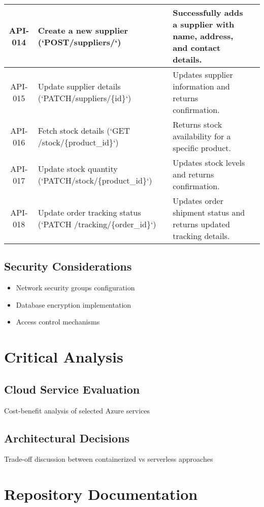 \documentclass{llncs}
\begin{document}
\begin{longtable}{|c|>{\raggedright}p{7.5cm}|p{5.5cm}|p{2cm}|}
API-014 & Create a new supplier (`POST/suppliers/`) & Successfully adds a supplier with name, address, and contact details. & \\ \hline
API-015 & Update supplier details (`PATCH/suppliers/\{id\}`) & Updates supplier information and returns confirmation. & \\ \hline
API-016 & Fetch stock details (`GET /stock/\{product\_id\}`) & Returns stock availability for a specific product. & \\ \hline
API-017 & Update stock quantity (`PATCH/stock/\{product\_id\}`) & Updates stock levels and returns confirmation. & \\ \hline
API-018 & Update order tracking status (`PATCH /tracking/\{order\_id\}`) & Updates order shipment status and returns updated tracking details. & \\ \hline
\end{longtable}

\subsection{Security Considerations}
\begin{itemize}
    \item Network security groups configuration
    \item Database encryption implementation
    \item Access control mechanisms
\end{itemize}

\section{Critical Analysis}
\subsection{Cloud Service Evaluation}
Cost-benefit analysis of selected Azure services

\subsection{Architectural Decisions}
Trade-off discussion between containerized vs serverless approaches

\section{Repository Documentation}
\end{document}
